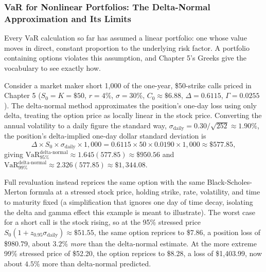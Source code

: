 \documentclass[../ai_in_finance]{subfiles}
\begin{document}
\subsubsection*{VaR for Nonlinear Portfolios: The Delta-Normal Approximation and Its Limits}
\label{sec:delta-normal}

Every VaR calculation so far has assumed a linear portfolio: one whose value moves in direct, constant proportion to the underlying risk factor. A portfolio containing options violates this assumption, and Chapter 5's Greeks give the vocabulary to see exactly how.

Consider a market maker short 1,000 of the one-year, \$50-strike calls priced in Chapter 5 ($S_0=K=\$50$, $r=4\%$, $\sigma=30\%$, $C_0\approx\$6.88$, $\Delta=0.6115$, $\Gamma=0.0255$). The delta-normal method approximates the position's one-day loss using only delta, treating the option price as locally linear in the stock price.
Converting the annual volatility to a daily figure the standard way, $\sigma_{\text{daily}} = 0.30/\sqrt{252} \approx 1.90\%$, the position's delta-implied one-day dollar standard deviation is
\begin{equation*}
\Delta \times S_0 \times \sigma_{\text{daily}} \times 1{,}000 = 0.6115 \times 50 \times 0.0190 \times 1{,}000 \approx \$577.85,
\end{equation*}
giving $\text{VaR}_{95\%}^{\text{delta-normal}} \approx 1.645(577.85) \approx \$950.56$ and $\text{VaR}_{99\%}^{\text{delta-normal}} \approx 2.326(577.85) \approx \$1{,}344.08$.

Full revaluation instead reprices the same option with the same Black-Scholes-Merton formula at a stressed stock price, holding strike, rate, volatility, and time to maturity fixed (a simplification that ignores one day of time decay, isolating the delta and gamma effect this example is meant to illustrate).
The worst case for a short call is the stock rising, so at the 95\% stressed price $S_0(1+z_{0.95}\sigma_{\text{daily}}) \approx \$51.55$, the same option reprices to \$7.86, a position loss of \$980.79, about $3.2\%$ \emph{more} than the delta-normal estimate. At the more extreme 99\% stressed price of \$52.20, the option reprices to \$8.28, a loss of \$1,403.99, now about $4.5\%$ more than delta-normal predicted.
\end{document}
